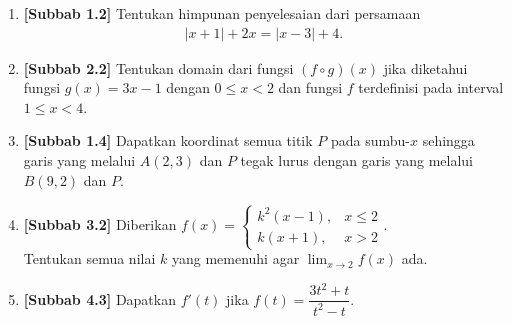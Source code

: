 \documentclass[10pt,openany,a4paper]{article}
\theoremstyle{definition}
\theoremstyle{definition}
\theoremstyle{plain}
\begin{document}
\begin{enumerate}
    \item \textbf{[Subbab 1.2]} Tentukan himpunan penyelesaian dari persamaan
    \begin{align*}
        |x+1|+2x=|x-3|+4.
    \end{align*}

    \item \textbf{[Subbab 2.2]} Tentukan domain dari fungsi $(f\circ g)(x)$ jika diketahui fungsi $g(x)=3x-1$ dengan $0\leq x<2$ dan fungsi $f$ terdefinisi pada interval $1\leq x<4$.

    \item \textbf{[Subbab 1.4]} Dapatkan koordinat semua titik $P$ pada sumbu-$x$ sehingga garis yang melalui $A(2,3)$ dan $P$ tegak lurus dengan garis yang melalui $B(9,2)$ dan $P$.

    \item \textbf{[Subbab 3.2]} Diberikan $f(x)=\begin{cases}
        k^2(x-1), & x\leq 2\\
        k(x+1), & x>2
    \end{cases}$.\\
    Tentukan semua nilai $k$ yang memenuhi agar $\displaystyle\lim_{x\to 2}f(x)$ ada.

    \item \textbf{[Subbab 4.3]} Dapatkan $f'(t)$ jika $f(t)=\dfrac{3t^2+t}{t^2-t}$.
\end{enumerate}

\newpage
\end{document}

